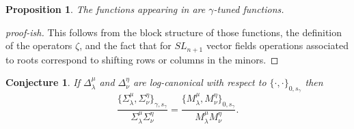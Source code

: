 \documentclass[a4paper]{amsart}
\newtheorem{proposition}[theorem]{Proposition}
\newtheorem{conjecture}[theorem]{Conjecture}
\theoremstyle{definition}
\begin{document}
\begin{proposition}
  The functions appearing in \cite{GSV19} are $\gamma$-tuned functions.
\end{proposition}
\begin{proof}[proof-ish]
  This follows from the block structure of those functions, the definition of the operators $\zeta$, and the fact that for $SL_{n+1}$ vector fields operations associated to roots correspond to shifting rows or columns in the minors. 
\end{proof}

\begin{conjecture}
  \label{conj: bracket comparison}
  If $\Delta_\lambda^\mu$ and $\Delta_\nu^\eta$ are log-canonical with respect to $\{\cdot,\cdot\}_{0,s_\gamma}$ then
  \[
    \frac{\{\Sigma_\lambda^\mu,\Sigma_\nu^\eta\}_{\gamma,s_\gamma}}{\Sigma_\lambda^\mu \Sigma_\nu^\eta} 
    = 
    \frac{\{M_\lambda^\mu,M_\nu^\eta\}_{0,s_\gamma}}{M_\lambda^\mu M_\nu^\eta}.
  \]
\end{conjecture}
\end{document}
